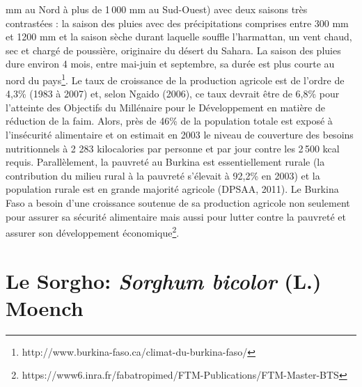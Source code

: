 \documentclass[a4paper,11pt]{article}
\begin{document}
mm au Nord à plus de 1\,000 mm au Sud-Ouest) avec deux saisons très
contrastées : la saison des pluies avec des précipitations comprises
entre 300 mm et 1200 mm et la saison sèche durant laquelle souffle
l’harmattan, un vent chaud, sec et chargé de poussière, originaire du
désert du Sahara. La saison des pluies dure environ 4 mois, entre
mai-juin et septembre, sa durée est plus courte au nord du
pays\footnote{http://www.burkina-faso.ca/climat-du-burkina-faso/}. Le
taux de croissance de la production agricole est de l’ordre de 4,3\%
(1983 à 2007) et, selon Ngaido (2006), ce taux devrait être de 6,8\%
pour l’atteinte des Objectifs du Millénaire pour le Développement en
matière de réduction de la faim. Alors, près de 46\% de la population
totale est exposé à l’insécurité alimentaire et on estimait en 2003 le
niveau de couverture des besoins nutritionnels à 2 283 kilocalories
par personne et par jour contre les 2\,500 kcal requis. Parallèlement,
la pauvreté au Burkina est essentiellement rurale (la contribution du
milieu rural à la pauvreté s’élevait à 92,2\% en 2003) et la
population rurale est en grande majorité agricole (DPSAA, 2011). Le
Burkina Faso a besoin d’une croissance soutenue de sa production
agricole non seulement pour assurer sa sécurité alimentaire mais aussi
pour lutter contre la pauvreté et assurer son développement
économique\footnote{https://www6.inra.fr/fabatropimed/FTM-Publications/FTM-Master-BTS}.

\section{Le Sorgho: \emph{Sorghum bicolor} (L.) Moench}


\end{document}
